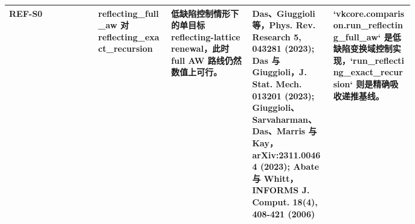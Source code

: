 \begin{tabular}{lp{0.18\linewidth}p{0.20\linewidth}p{0.20\linewidth}p{0.20\linewidth}}
REF-S0 & reflecting\_full\_aw 对 reflecting\_exact\_recursion & 低缺陷控制情形下的单目标 reflecting-lattice renewal，此时 full AW 路线仍然数值上可行。 & Das、Giuggioli 等，Phys. Rev. Research 5, 043281 (2023); Das 与 Giuggioli，J. Stat. Mech. 013201 (2023); Giuggioli、Sarvaharman、Das、Marris 与 Kay，arXiv:2311.00464 (2023); Abate 与 Whitt，INFORMS J. Comput. 18(4), 408-421 (2006) & `vkcore.comparison.run\_reflecting\_full\_aw` 是低缺陷变换域控制实现，`run\_reflecting\_exact\_recursion` 则是精确吸收递推基线。 \\
\bottomrule
\end{tabular}

